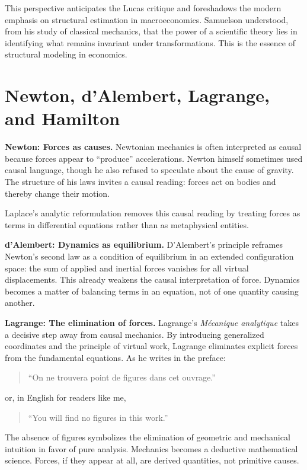 \documentclass[12pt]{article}
\begin{document}
This perspective anticipates the Lucas critique and foreshadows the modern emphasis on structural estimation in macroeconomics. Samuelson understood, from his study of classical mechanics, that the power of a scientific theory lies in identifying what remains invariant under transformations. This is the essence of structural modeling in economics.




\section{Newton, d'Alembert, Lagrange, and Hamilton}

\textbf{Newton: Forces as causes.} Newtonian mechanics is often interpreted as causal because forces appear to ``produce'' accelerations. Newton himself sometimes used causal language, though he also refused to speculate about the cause of gravity. The structure of his laws invites a causal reading: forces act on bodies and thereby change their motion.

Laplace's analytic reformulation removes this causal reading by treating forces as terms in differential equations rather than as metaphysical entities.

\textbf{d'Alembert: Dynamics as equilibrium.} D'Alembert's principle reframes Newton's second law as a condition of equilibrium in an extended configuration space: the sum of applied and inertial forces vanishes for all virtual displacements. This already weakens the causal interpretation of force. Dynamics becomes a matter of balancing terms in an equation, not of one quantity causing another.

\textbf{Lagrange: The elimination of forces.} Lagrange's \emph{M\'ecanique analytique} takes a decisive step away from causal mechanics. By introducing generalized coordinates and the principle of virtual work, Lagrange eliminates explicit forces from the fundamental equations. As he writes in the preface:

\begin{quote}
``On ne trouvera point de figures dans cet ouvrage.''
\end{quote}

or, in English for readers like me,

\begin{quote}
``You will find no figures in this work.''
\end{quote}

The absence of figures symbolizes the elimination of geometric and mechanical intuition in favor of pure analysis. Mechanics becomes a deductive mathematical science. Forces, if they appear at all, are derived quantities, not primitive causes.
\end{document}
